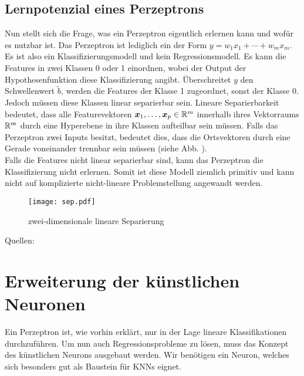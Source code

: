\subsection{Lernpotenzial eines Perzeptrons}
Nun stellt sich die Frage, was ein Perzeptron eigentlich erlernen kann und wofür
es nutzbar ist.
Das Perzeptron ist lediglich ein  der Form
$y = w_1x_1 + \cdots + w_m x_m$. Es ist also ein Klassifizierungsmodell und kein Regressionsmodell.
Es kann die Features in zwei Klassen 0 oder 1 einordnen, wobei der Output der
Hypothesenfunktion diese Klassifizierung angibt.
Überschreitet $y$ den Schwellenwert $\tilde{b}$, werden die Features der Klasse 1 zugeordnet, sonst
der Klasse 0.
Jedoch müssen diese Klassen linear separierbar sein.
\para{}
Lineare Separierbarkeit bedeutet, dass alle Featurevektoren $\bm{x}_1,\ldots,\bm{x}_p \in \mathbb{R}^m$
innerhalb ihres Vektorraums $\mathbb{R}^m$ durch eine Hyperebene in ihre Klassen aufteilbar sein müssen.
Falls das Perzeptron zwei Inputs besitzt, bedeutet dies, dass die Ortsvektoren
durch eine Gerade voneinander trennbar sein müssen (siehe Abb.
). \\
Falls die Features nicht linear separierbar sind,
kann das Perzeptron die Klassifizierung nicht erlernen. Somit ist diese Modell
ziemlich primitiv und kann nicht auf komplizierte nicht-lineare Problemstellung
angewandt werden.
\\
\begin{figure}[h!]
  \centering
  \texttt{[image: sep.pdf]}
  \caption{zwei-dimensionale lineare Separierung}
  \label{fig:linearer_Klassifikator}
\end{figure}
\para{}
Quellen: \cite{wiki:perzeptron} \cite{wiki:linear_separability}

\section{Erweiterung der künstlichen Neuronen}\label{sec:künstlicheNeuronen}
Ein Perzeptron ist, wie vorhin erklärt, nur in der Lage lineare Klassifikationen
durchzuführen. Um nun auch Regressionsprobleme zu lösen, muss das Konzept des
künstlichen Neurons ausgebaut werden. Wir benötigen ein Neuron, welches sich
besonders gut als Baustein für KNNs eignet.


